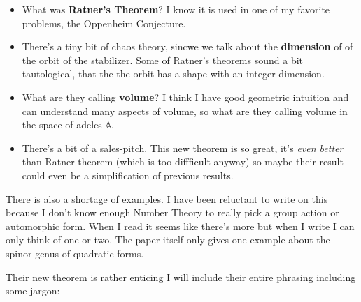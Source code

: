 \documentclass[12pt]{article}
\begin{document}
\begin{itemize}
\item What was \textbf{Ratner's Theorem}?  I know it is used in one of my favorite problems, the Oppenheim Conjecture. 
\item There's a tiny bit of chaos theory, sincwe we talk about the \textbf{dimension} of of the orbit of the stabilizer.  Some of Ratner's theorems sound a bit tautological, that the the orbit has a shape with an integer dimension.  
\item What are they calling \textbf{volume}?  I think I have good geometric intuition and can understand many aspects of volume, so what are they calling volume in the space of adeles $\mathbb{A}$.
\item There's a bit of a sales-pitch.  This new theorem is so great, it's \textit{even better} than Ratner theorem (which is too diffficult anyway) so maybe their result could even be a simplification of previous results. 
\end{itemize}
There is also a shortage of examples.  I have been reluctant to write on this because I don't know enough Number Theory to really pick a group action or automorphic form.  When I read it seems like there's more but when I write I can only think of one or two.  The paper itself only gives one example about the spinor genus of quadratic forms.

\newpage

\noindent Their new theorem is rather enticing I will include their entire phrasing including some jargon:
\end{document}
